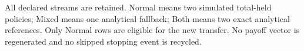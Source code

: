 \par\medskip\noindent\footnotesize All declared streams are retained. Normal means two simulated total-held policies; Mixed means one analytical fallback; Both means two exact analytical references. Only Normal rows are eligible for the new transfer. No payoff vector is regenerated and no skipped stopping event is recycled.
\endgroup
